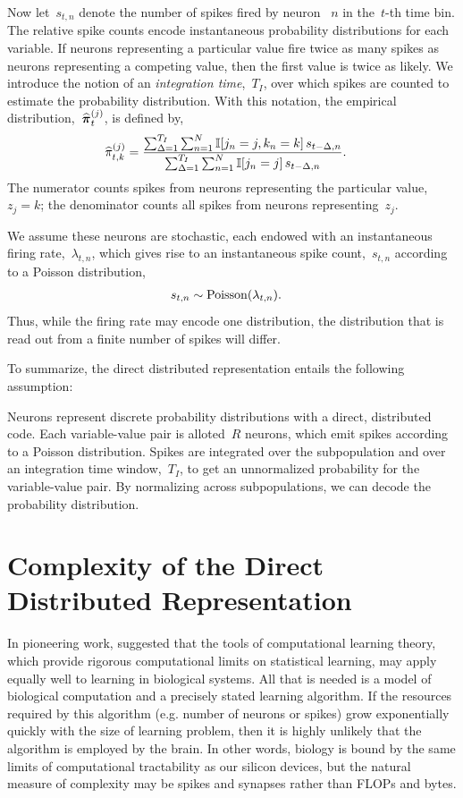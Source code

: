 Now let~$s_{t,n}$ denote the number of spikes fired by neuron ~$n$ in
the~$t$-th time bin. The relative spike counts encode instantaneous
probability distributions for each variable.  If neurons representing
a particular value fire twice as many spikes as neurons representing a
competing value, then the first value is twice as likely. We introduce
the notion of an \emph{integration time},~$T_I$, over which spikes are
counted to estimate the probability distribution. With this notation,
the empirical distribution,~$\widehat{\boldsymbol{\pi}}_t^{(j)}$, is defined by,
\begin{align}
  \widehat{\pi}_{t,k}^{(j)} &=
  \frac{\sum_{\Delta = 1}^{T_I} \sum_{n=1}^N \mathbb{I}[j_n=j, k_n=k] \, s_{t-\Delta,n}}
       {\sum_{\Delta = 1}^{T_I} \sum_{n=1}^N \mathbb{I}[j_n=j] \, s_{t-\Delta,n}}.
\end{align}
The numerator counts spikes from neurons representing the particular value,~$z_j=k$;
the denominator counts all spikes from neurons representing~$z_j$.


We assume these neurons are stochastic, each endowed
with an instantaneous firing rate,~$\lambda_{t,n}$, which gives rise to an
instantaneous spike count,~$s_{t,n}$ according to a Poisson distribution,
\begin{align}
s_{t,n} &\sim \mathrm{Poisson}(\lambda_{t,n}).
\end{align}
Thus, while the firing rate may encode one distribution, the distribution
that is read out from a finite number of spikes will differ. 

To summarize, the direct distributed representation entails the following
assumption:

\begin{assumption}
  Neurons represent discrete probability distributions with a direct,
  distributed code. Each variable-value pair is alloted~$R$ neurons,
  which emit spikes according to a Poisson distribution.
  Spikes are integrated over the subpopulation and over an integration
  time window,~$T_I$, to get an unnormalized probability for the
  variable-value pair. By normalizing across subpopulations, we can decode
  the probability distribution. 
\end{assumption}

\section{Complexity of the Direct Distributed Representation}
\label{sec:complexity}

In pioneering work, \citet{valiant1994circuits} suggested that
the tools of computational learning theory, which provide
rigorous computational limits on statistical learning, may
apply equally well to learning in biological systems. All
that is needed is a model of biological computation and a
precisely stated learning algorithm. If the resources
required by this algorithm (e.g. number of neurons or spikes)
grow exponentially quickly with the size of learning problem,
then it is highly unlikely that the algorithm is employed
by the brain. In other words, biology is bound by the same
limits of computational tractability as our silicon devices,
but the natural measure of complexity may be spikes and
synapses rather than FLOPs and bytes.

